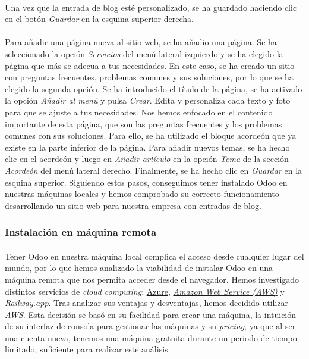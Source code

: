 \paragraph{}
Una vez que la entrada de blog esté personalizado, se ha guardado haciendo clic en el botón \textit{Guardar} en la esquina superior derecha.
\paragraph{}
Para añadir una página nueva al sitio web, se ha añadio una página. Se ha seleccionado la opción \textit{Servicios} del menú lateral izquierdo y se ha elegido la página que más se adecua a tus necesidades. En este caso, se ha creado un sitio con preguntas frecuentes, problemas comunes y sus soluciones, por lo que se ha elegido la segunda opción. Se ha introducido el título de la página, se ha activado la opción \textit{Añadir al menú} y pulsa \textit{Crear}. Edita y personaliza cada texto y foto para que se ajuste a tus necesidades. Nos hemos enfocado en el contenido importante de esta página, que son las preguntas frecuentes y los problemas comunes con sus soluciones. Para ello, se ha utilizado el bloque acordeón que ya existe en la parte inferior de la página. Para añadir nuevos temas, se ha hecho clic en el acordeón y luego en \textit{Añadir artículo} en la opción \textit{Tema} de la sección \textit{Acordeón} del menú lateral derecho. Finalmente, se ha hecho clic en \textit{Guardar} en la esquina superior. Siguiendo estos pasos, conseguimos tener instalado Odoo en nuestras máquinas locales y hemos comprobado su correcto funcionamiento desarrollando un sitio web para nuestra empresa con entradas de blog.

\subsubsection{Instalación en máquina remota}
\paragraph{}
Tener Odoo en nuestra máquina local complica el acceso desde cualquier lugar del mundo, por lo que hemos analizado la viabilidad de instalar Odoo en una máquina remota que nos permita acceder desde el navegador. Hemos investigado distintos servicios de \textit{cloud computing}; \href{https://azure.microsoft.com/en-us/}{Azure}, \href{https://aws.amazon.com}{\textit{Amazon Web Service (AWS)}} y \href{https://railway.app}{\textit{Railway.app}}. Tras analizar sus ventajas y desventajas, hemos decidido utilizar \textit{AWS}. Esta decisión se basó en su facilidad para crear una máquina, la intuición de su interfaz de consola para gestionar las máquinas y su \textit{pricing}, ya que al ser una cuenta nueva, tenemos una máquina gratuita durante un periodo de tiempo limitado; suficiente para realizar este análisis.

